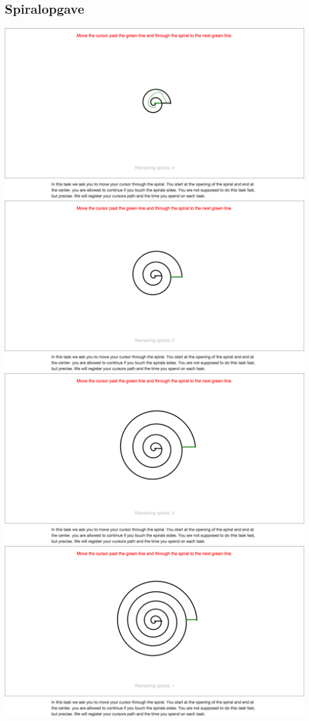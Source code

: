 \subsection*{Spiralopgave}
\begin{minipage}{\linewidth}
	\centering
	\includegraphics[width=.4\linewidth, trim = 5cm 14cm 5cm 8cm, clip]{images/screenshots/ex_step_5_spiral_path}
	\label{fig:ex_spiral_1}
	\includegraphics[width=.4\linewidth, trim = 5cm 14cm 5cm 8cm, clip]{images/screenshots/ex_step_5_spiral_2}
	\label{fig:ex_spiral_2}
	\includegraphics[width=.5\linewidth, trim = 5cm 14cm 5cm 8cm, clip]{images/screenshots/ex_step_5_spiral_3}
	\label{fig:ex_spiral_3}
	\includegraphics[width=.5\linewidth, trim = 5cm 14cm 5cm 8cm, clip]{images/screenshots/ex_step_5_spiral_4}
	\label{fig:ex_spiral_4}
\end{minipage}\\\\
